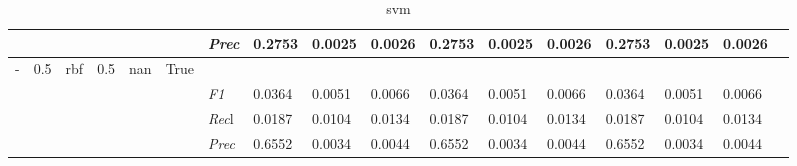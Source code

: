 \begin{table}[]
\begin{tabularx}{\textwidth}{XXXXXX|X|XXX|XXX|XXXX}
    & & & & & & \textit{Prec} & 0.2753 & 0.0025 & 0.0026 & 0.2753 & 0.0025 & 0.0026 & 0.2753 & 0.0025 & 0.0026 \\ \midrule
    - & 0.5 & rbf & 0.5 & nan &True & & & & & & & & & \\
    & & & & & & \textit{F1} & 0.0364 & 0.0051 & 0.0066 & 0.0364 & 0.0051        & 0.0066        & 0.0364        & 0.0051        & 0.0066        \\
    & & & & & & \textit{Rec}l & 0.0187 & 0.0104 & 0.0134    & 0.0187 & 0.0104    & 0.0134    & 0.0187    & 0.0104    & 0.0134    \\
    & & & & & & \textit{Prec} & 0.6552 & 0.0034 & 0.0044 & 0.6552 & 0.0034 & 0.0044 & 0.6552 & 0.0034 & 0.0044 \\ \midrule
    \end{tabularx}
    \caption{svm}
    \label{tab:all_results_svm}
    \end{table} 